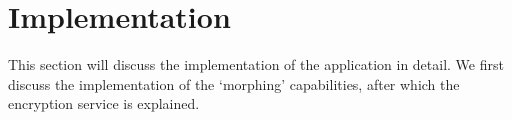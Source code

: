 \section{Implementation}
\label{sec:implementation}

This section will discuss the implementation of the application in detail. 
We first discuss the implementation of the `morphing' capabilities, after which the encryption service is explained.








